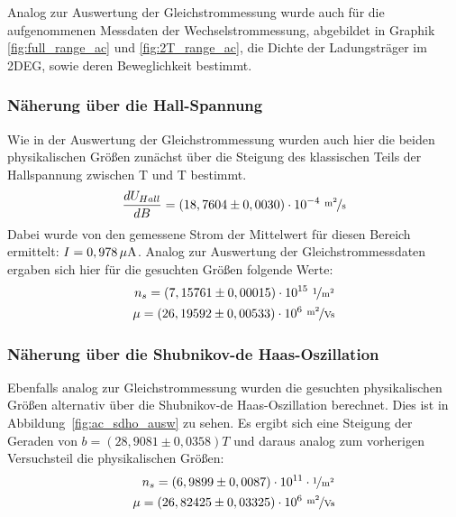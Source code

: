 

Analog zur Auswertung der Gleichstrommessung wurde auch für die aufgenommenen Messdaten der Wechselstrommessung, abgebildet in Graphik \ref{fig:full_range_ac} und \ref{fig:2T_range_ac}, die Dichte der Ladungsträger im 2DEG, sowie deren Beweglichkeit bestimmt.

\subsubsection{Näherung über die Hall-Spannung}
\label{ch:naeherung_hall2}

Wie in der Auswertung der Gleichstrommessung wurden auch hier die beiden physikalischen Größen zunächst über die Steigung des klassischen Teils der Hallspannung zwischen \unit[-1]{T} und \unit[1]{T} bestimmt.
\begin{equation}
	\d{U_{Hall}}{B} = ( 18,7604 \pm 0,0030 ) \cdot 10^{-4} ~ \unitfrac{m^2}{s}
\end{equation} %
Dabei wurde von den gemessene Strom der Mittelwert für diesen Bereich ermittelt: $I=\unit[0,978]{\mu A}$. Analog zur Auswertung der Gleichstrommessdaten ergaben sich hier für die gesuchten Größen folgende Werte: 
\begin{align}
n_s=  ( 7,15761 \pm 0,00015) \cdot 10^{15} ~ \unitfrac{1}{m^2}\\ %
\mu= (26,19592\pm 0,00533) \cdot 10^6 ~ \unitfrac{m^2}{Vs} %
\end{align}


\subsubsection{Näherung über die Shubnikov-de Haas-Oszillation}
\label{ch:naeherung_ac}

Ebenfalls analog zur Gleichstrommessung wurden die gesuchten physikalischen Größen alternativ über die Shubnikov-de Haas-Oszillation berechnet. Dies ist in Abbildung~\ref{fig:ac_sdho_ausw} zu sehen. 
Es ergibt sich eine Steigung der Geraden von $b=(28,9081 \pm 0,0358)\unit{T}$ und daraus analog zum vorherigen Versuchsteil die physikalischen Größen: 
\begin{align}
n_s= (6,9899 \pm 0,0087)\cdot 10^{11} \cdot \unitfrac{1}{m^2} \\ %
\mu= (26,82425 \pm 0,03325)\cdot 10^6 ~ \unitfrac{m^2}{Vs} %
\end{align} 
   
